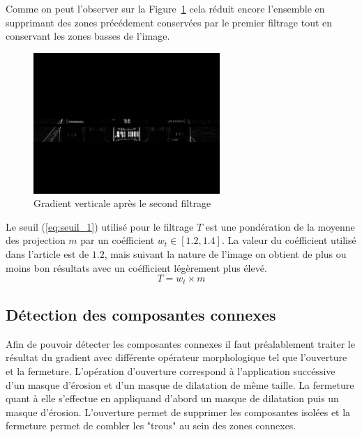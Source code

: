 \documentclass[a4paper,10pt,twocolumn]{article}
\begin{document}
Comme on peut l'observer sur la Figure~\ref{v_filter_gauss} cela réduit encore l'ensemble en supprimant des zones précédement conservées par le premier filtrage tout en conservant les zones basses de l'image.
\begin{figure}[H]
	\centering 
	  \includegraphics[width=200pt]{img/991213-006_v_filter_gauss.png}
	\caption{Gradient verticale après le second filtrage\label{v_filter_gauss}}
\end{figure}

Le seuil (\ref{eq:seuil_1}) utilisé pour le filtrage $T$ est une pondération de la moyenne des projection $m$ par un coéfficient $w_t \in [1.2, 1.4]$. La valeur du coéfficient utilisé dans l'article est de $1.2$, mais suivant la nature de l'image on obtient de plus ou moins bon résultats avec un coéfficient légèrement plus élevé.
\begin{equation} \label{eq:seuil_1} 
  T = w_t \times m
\end{equation}

\subsection{Détection des composantes connexes}
Afin de pouvoir détecter les composantes connexes il faut préalablement traiter le résultat du gradient avec différente opérateur morphologique tel que l'ouverture et la fermeture. L'opération d'ouverture correspond à l'application succéssive d'un masque d'érosion et d'un masque de dilatation de même taille. La fermeture quant à elle s'effectue en appliquand d'abord un masque de dilatation puis un masque d'érosion. L'ouverture permet de supprimer les composantes isolées et la fermeture permet de combler les "trous" au sein des zones connexes.
\end{document}
